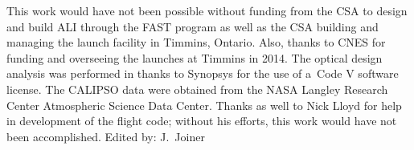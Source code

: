 \documentclass[amt]{copernicus}
\begin{document}
\begin{acknowledgements}
  This work would have not been possible without funding from the CSA
  to design and build ALI through the FAST program as well as the CSA
  building and managing the launch facility in Timmins, Ontario. Also,
  thanks to CNES for funding and overseeing the launches at Timmins in
  2014. The optical design analysis was performed in thanks to
  Synopsys for the use of a~Code V software license. The CALIPSO data
  were obtained from the NASA Langley Research Center Atmospheric
  Science Data Center. Thanks as well to Nick Lloyd for help in
  development of the flight code; without his efforts, this work would
  have not been accomplished.
  \hack{\newline}
\hack{\newline}
Edited by: J.~Joiner
\end{acknowledgements}

\hack{\vspace{-3mm}}
\end{document}
